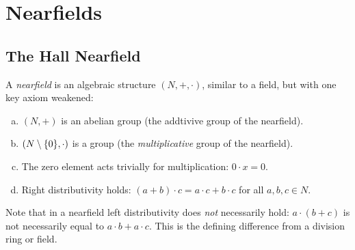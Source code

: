 \chapter{Nearfields}

\section{The Hall Nearfield}

\begin{defn}
    A \textsl{nearfield} is an algebraic structure $(N,+,\cdot)$, similar to a field, but with one key axiom weakened:
    \begin{enumerate}[a)]
        \item $(N, +)$ is an abelian group (the addtivive group of the nearfield).
        \item $(N \setminus\{0\},\cdot)$ is a group (the \textsl{multiplicative} group of the nearfield).
        \item The zero element acts trivially for multiplication: $0\cdot x=0$.
        \item Right distributivity holds: $(a+b)\cdot c= a\cdot c + b\cdot c$ for all $a,b,c\in N$.
    \end{enumerate}
\end{defn}

\begin{rem}
    Note that in a nearfield left distributivity does \textit{not} necessarily hold: $a\cdot(b+c)$ is not necessarily equal to $a\cdot b + a\cdot c$. This is the defining difference from a division ring or field.
\end{rem}

